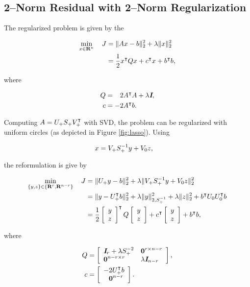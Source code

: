 \documentclass{article}
\begin{document}
\subsection{2--Norm Residual with 2--Norm Regularization}

    The regularized problem is given by the \QP

    \begin{align*}
        \min_{x\in\textbf{R}^n}\quad J
        &=
        \|Ax-b\|_2^2+\lambda\| x\|_2^2\\
        &=\frac{1}{2} x^\intercal Q x + c^\intercal x +b^\intercal b,
    \end{align*}

    where

    \begin{align*}
        Q
        &=
            \minus 2A^\tp A+\lambda\eye,
        \\
            c
        &=
            -2A^\tp b.
    \end{align*}

    Computing $A=U_+S_+V_+^\intercal$ with SVD, 
    the problem can be regularized with uniform circles 
    (as depicted in Figure \ref{fig:lasso}). Using

    \begin{align*}
        x&=V_+ S_+^{-1} y+V_0 z,
    \end{align*}

    the reformulation is give by

    \begin{align*}
        \min_{\{y,z\}\in\{\textbf{R}^r,\textbf{R}^{n-r}\}}\quad J &= \|U_+ y -  b\|_2^2 + \lambda\|V_+ S_+^{-1} y+V_0 z\|_2^2\\
        &= \|y-U_+^\intercal b\|_2^2 + \lambda\|y\|_{2,S_+^{-1}}^2+\lambda \|z\|_2^2 + b^\intercal U_0U_0^\intercal b\\
        &=\frac{1}{2} \left[\begin{array}{lllllllllllllllllll}y\\z\end{array}\right]^\intercal Q \left[\begin{array}{lllllllllllllllllll}y\\z\end{array}\right] + c^\intercal \left[\begin{array}{lllllllllllllllllll}y\\z\end{array}\right] +b^\intercal b,
    \end{align*}

    where

    \begin{align*}
        Q
        &=
            \mat{\eye_r+\lambda S_+^{-2} & \zeros^{r\times {n-r}} \\
            \zeros^{n-r\times r} & \lambda\eye_{n-r} },
        \\
            c
        &=  \mat{
            -2\lrs^\tp b\\
            \minus \zeros^{n-r}
            }.
    \end{align*}
\end{document}
